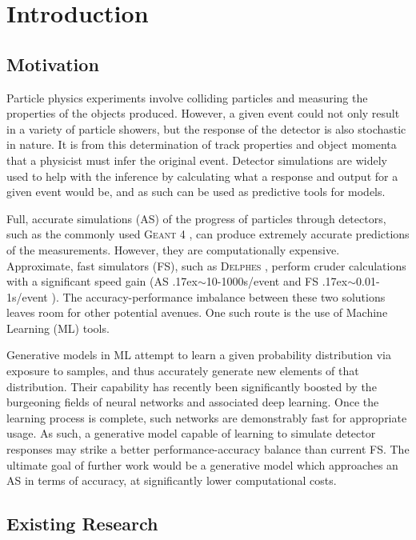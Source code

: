 \documentclass[twocolumn,twoside]{article}
\newcommand{\pkg}[1]{\textsc{#1}}
\newcommand{\around}{{\raise.17ex\hbox{$\scriptstyle\sim$}}}
\begin{document}
\section{Introduction}

\subsection{Motivation}
Particle physics experiments involve colliding particles and measuring the properties of the objects produced. However, a given event could not only result in a variety of particle showers, but the response of the detector is also stochastic in nature. It is from this determination of track properties and object momenta that a physicist must infer the original event. Detector simulations are widely used to help with the inference by calculating what a response and output for a given event would be, and as such can be used as predictive tools for models.

Full, accurate simulations (AS) of the progress of particles through detectors, such as the commonly used \pkg{Geant} 4 \cite{geant4}, can produce extremely accurate predictions of the measurements. However, they are computationally expensive. Approximate, fast simulators (FS), such as \pkg{Delphes} \cite{delphes}, perform cruder calculations with a significant speed gain (AS \around10-1000s/event and FS \around0.01-1s/event \cite{delphessl}). The accuracy-performance imbalance between these two solutions leaves room for other potential avenues. One such route is the use of Machine Learning (ML) tools.

Generative models in ML attempt to learn a given probability distribution via exposure to samples, and thus accurately generate new elements of that distribution. Their capability has recently been significantly boosted by the burgeoning fields of neural networks and associated deep learning. Once the learning process is complete, such networks are demonstrably fast for appropriate usage. As such, a generative model capable of learning to simulate detector responses may strike a better performance-accuracy balance than current FS. The ultimate goal of further work would be a generative model which approaches an AS in terms of accuracy, at significantly lower computational costs.

\subsection{Existing Research}
\end{document}
